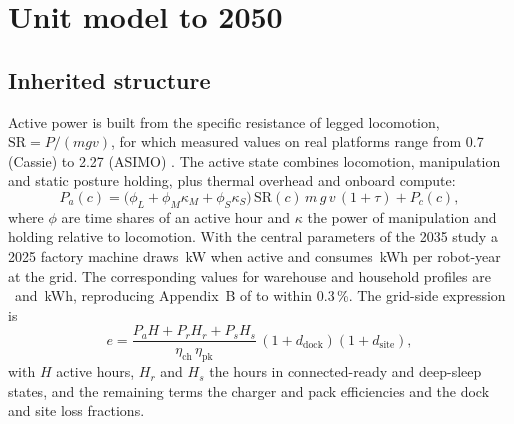 \documentclass[11pt]{article}
\begin{document}
\section{Unit model to 2050}\label{sec:unit}

\subsection{Inherited structure}
Active power is built from the specific resistance of legged locomotion, $\mathrm{SR}=P/(mgv)$, for which measured values on real platforms range from 0.7 (Cassie) to 2.27 (ASIMO) \citep{kashiri2018}. The active state combines locomotion, manipulation and static posture holding, plus thermal overhead and onboard compute:
\begin{equation}\label{eq:active}
P_a(c) = \big(\phi_L + \phi_M\kappa_M + \phi_S\kappa_S\big)\,\mathrm{SR}(c)\,m\,g\,v\,(1+\tau) + P_c(c),
\end{equation}
where $\phi$ are time shares of an active hour and $\kappa$ the power of manipulation and holding relative to locomotion. With the central parameters of the 2035 study a 2025 factory machine draws \UnitFacPaTwentyFive\,kW when active and consumes \UnitFacTwentyFive\,kWh per robot-year at the grid. The corresponding values for warehouse and household profiles are \UnitWhTwentyFive\ and \UnitHhTwentyFive\,kWh, reproducing Appendix~B of \citet{merilehto2026a} to within 0.3\,\%. The grid-side expression is
\begin{equation}\label{eq:grid}
e = \frac{P_a H + P_r H_r + P_s H_s}{\eta_{\mathrm{ch}}\,\eta_{\mathrm{pk}}}\,(1+d_{\mathrm{dock}})(1+d_{\mathrm{site}}),
\end{equation}
with $H$ active hours, $H_r$ and $H_s$ the hours in connected-ready and deep-sleep states, and the remaining terms the charger and pack efficiencies and the dock and site loss fractions.
\end{document}
